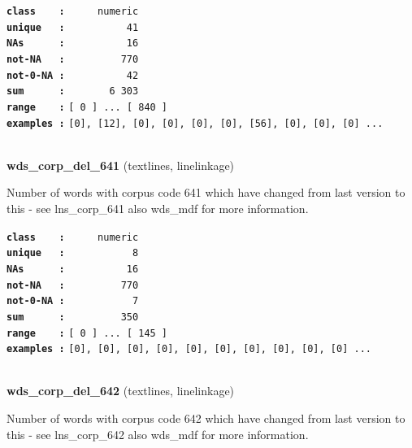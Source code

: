 \documentclass[]{article}
\begin{document}
\textbf{\texttt{class\ \ \ \ :}} \texttt{~~~~~numeric}\\
\textbf{\texttt{unique\ \ \ :}} \texttt{~~~~~~~~~~41}\\
\textbf{\texttt{NAs\ \ \ \ \ \ :}} \texttt{~~~~~~~~~~16}\\
\textbf{\texttt{not-NA\ \ \ :}} \texttt{~~~~~~~~~770}\\
\textbf{\texttt{not-0-NA\ :}} \texttt{~~~~~~~~~~42}\\
\textbf{\texttt{sum\ \ \ \ \ \ :}} \texttt{~~~~~~~6~303}\\
\textbf{\texttt{range\ \ \ \ :}}
\texttt{{[}\ 0\ {]}\ ...\ {[}\ 840\ {]}}\\
\textbf{\texttt{examples\ :}}
\texttt{{[}0{]},\ {[}12{]},\ {[}0{]},\ {[}0{]},\ {[}0{]},\ {[}0{]},\ {[}56{]},\ {[}0{]},\ {[}0{]},\ {[}0{]}\ ...}\\

~

\textbf{wds\_corp\_del\_641} (textlines, linelinkage)

Number of words with corpus code 641 which have changed from last
version to this - see lns\_corp\_641 also wds\_mdf for more information.

\textbf{\texttt{class\ \ \ \ :}} \texttt{~~~~~numeric}\\
\textbf{\texttt{unique\ \ \ :}} \texttt{~~~~~~~~~~~8}\\
\textbf{\texttt{NAs\ \ \ \ \ \ :}} \texttt{~~~~~~~~~~16}\\
\textbf{\texttt{not-NA\ \ \ :}} \texttt{~~~~~~~~~770}\\
\textbf{\texttt{not-0-NA\ :}} \texttt{~~~~~~~~~~~7}\\
\textbf{\texttt{sum\ \ \ \ \ \ :}} \texttt{~~~~~~~~~350}\\
\textbf{\texttt{range\ \ \ \ :}}
\texttt{{[}\ 0\ {]}\ ...\ {[}\ 145\ {]}}\\
\textbf{\texttt{examples\ :}}
\texttt{{[}0{]},\ {[}0{]},\ {[}0{]},\ {[}0{]},\ {[}0{]},\ {[}0{]},\ {[}0{]},\ {[}0{]},\ {[}0{]},\ {[}0{]}\ ...}\\

~

\textbf{wds\_corp\_del\_642} (textlines, linelinkage)

Number of words with corpus code 642 which have changed from last
version to this - see lns\_corp\_642 also wds\_mdf for more information.
\end{document}
